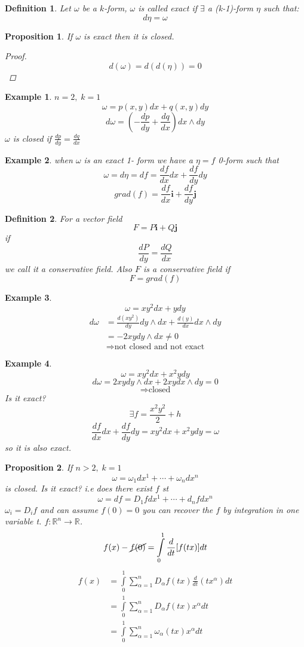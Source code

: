 \documentclass[11pt]{article}
\def\RR{\mathbb{R}}
\newtheorem{definition}{Definition}[section]
\newtheorem{example}{Example}[section]
\newtheorem{proposition}{Proposition}[section]
\begin{document}
\begin{definition}
Let $\omega$ be a $k$-form, $\omega$ is called exact if $\exists$ a (k-1)-form $\eta$ such that:
\[ d\eta = \omega \]
\end{definition}

\begin{proposition}
If $\omega$ is exact then it is closed.
\begin{proof}
\[d(\omega) = d(d(\eta)) = 0\]
\end{proof}
\end{proposition}

\begin{example}
$n=2,\;k=1$
\[\omega = p(x,y)dx + q(x,y)dy\]
\[d\omega = \left(-\frac{dp}{dy} + \frac{dq}{dx}\right)dx\wedge dy\]
$\omega$ is closed if $\frac{dp}{dy} = \frac{dq}{dx}$
\end{example}

\begin{example}
when $\omega$ is an exact 1- form we have a $\eta = f$ 0-form such that
\[\omega = d\eta = df = \frac{df}{dx}dx + \frac{df}{dy}dy\]
\[grad(f) =  \frac{df}{dx}\mathbf{i} + \frac{df}{dy}\mathbf{j}\]
\end{example}
\begin{definition}
For a vector field 
\[F=P\mathbf{i} + Q\mathbf{j}\]
if
\[\frac{dP}{dy} = \frac{dQ}{dx}\]
we call it a conservative field. Also $F$ is a conservative field if
\[F = grad(f)\]
\end{definition}

\begin{example}
\[\omega = xy^2dx + ydy\]
\begin{align*}
d\omega &= \frac{d(xy^2)}{dy}dy\wedge dx + \frac{d(y)}{dx}dx\wedge dy\\
&= -2xydy\wedge dx \neq 0 \end{align*}
\[\Rightarrow \text{not closed and not exact}\] 
\end{example}

\begin{example}
\[\omega = xy^2dx + x^2ydy\]
\[d\omega = 2xydy\wedge dx + 2xydx\wedge dy = 0 \]
\[\Rightarrow \text{closed}\] 
Is it exact?
\[\exists f=\frac{x^2y^2}{2} +h\]
\[\frac{df}{dx}dx + \frac{df}{dy}dy = xy^2dx + x^2ydy =\omega\]
so it is also exact.
\end{example}

\begin{proposition}
If $n>2, \; k=1$ 
\[\omega = \omega_1dx^1 + \cdots + \omega_ndx^n\]
is closed. Is it exact? i.e does there exist $f$ st
\[\omega = df = D_1fdx^1 + \cdots + d_nfdx^n\]
$ \omega_i = D_if$ and can assume $f(0)=0$ you can recover the $f$ by integration in one variable t. $f:\RR^n \rightarrow \RR$.
\[f(x) -\cancel{f(0)} = \int\limits_{0}^1\frac{d}{dt}[f(tx)]dt\]
\begin{align*}
f(x) &= \int\limits_{0}^1\sum\limits_{\alpha=1}^nD_\alpha f(tx)\frac{d}{dt}(tx^\alpha)dt\\
 &= \int\limits_{0}^1\sum\limits_{\alpha=1}^nD_\alpha f(tx)x^\alpha dt\\
&= \int\limits_{0}^1\sum\limits_{\alpha=1}^n\omega_\alpha(tx)x^\alpha dt
\end{align*}
\end{proposition}
\end{document}
